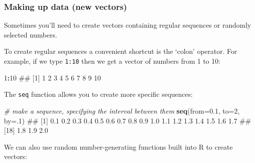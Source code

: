 \documentclass[]{article}
\newenvironment{Shaded}{\begin{snugshade}}{\end{snugshade}}
\newcommand{\KeywordTok}[1]{\textcolor[rgb]{0.13,0.29,0.53}{\textbf{#1}}}
\newcommand{\DataTypeTok}[1]{\textcolor[rgb]{0.13,0.29,0.53}{#1}}
\newcommand{\DecValTok}[1]{\textcolor[rgb]{0.00,0.00,0.81}{#1}}
\newcommand{\FloatTok}[1]{\textcolor[rgb]{0.00,0.00,0.81}{#1}}
\newcommand{\CommentTok}[1]{\textcolor[rgb]{0.56,0.35,0.01}{\textit{#1}}}
\newcommand{\OperatorTok}[1]{\textcolor[rgb]{0.81,0.36,0.00}{\textbf{#1}}}
\newcommand{\NormalTok}[1]{#1}
\theoremstyle{definition}
\theoremstyle{definition}
\theoremstyle{definition}
\theoremstyle{remark}
\begin{document}
\subsubsection*{Making up data (new
vectors)}\label{making-up-data-new-vectors}

Sometimes you'll need to create vectors containing regular sequences or
randomly selected numbers.

To create regular sequences a convenient shortcut is the `colon'
operator. For example, if we type \texttt{1:10} then we get a vector of
numbers from 1 to 10:

\begin{Shaded}
\begin{Highlighting}[]
\DecValTok{1}\OperatorTok{:}\DecValTok{10}
\NormalTok{##  [1]  1  2  3  4  5  6  7  8  9 10}
\end{Highlighting}
\end{Shaded}

The \texttt{seq} function allows you to create more specific sequences:

\begin{Shaded}
\begin{Highlighting}[]
\CommentTok{# make a sequence, specifying the interval between them}
\KeywordTok{seq}\NormalTok{(}\DataTypeTok{from=}\FloatTok{0.1}\NormalTok{, }\DataTypeTok{to=}\DecValTok{2}\NormalTok{, }\DataTypeTok{by=}\NormalTok{.}\DecValTok{1}\NormalTok{)}
\NormalTok{##  [1] 0.1 0.2 0.3 0.4 0.5 0.6 0.7 0.8 0.9 1.0 1.1 1.2 1.3 1.4 1.5 1.6 1.7}
\NormalTok{## [18] 1.8 1.9 2.0}
\end{Highlighting}
\end{Shaded}

We can also use random number-generating functions built into R to
create vectors:
\end{document}
